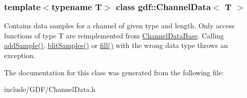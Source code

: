 \subsubsection*{template$<$typename T$>$ class gdf::ChannelData$<$ T $>$}

Contains data samples for a channel of given type and length. Only access functions of type T are reimplemented from \hyperlink{classgdf_1_1_channel_data_base}{ChannelDataBase}. Calling \hyperlink{classgdf_1_1_channel_data_a72660b2608d86888a61a51efad28007c}{addSample()}, \hyperlink{classgdf_1_1_channel_data_a5055b2f003e69afd238b064e795adc53}{blitSamples()} or \hyperlink{classgdf_1_1_channel_data_afebe6672e849f3ca33804e8fb5e73d8c}{fill()} with the wrong data type throws an exception. 

The documentation for this class was generated from the following file:\begin{DoxyCompactItemize}
\item 
include/GDF/ChannelData.h\end{DoxyCompactItemize}
